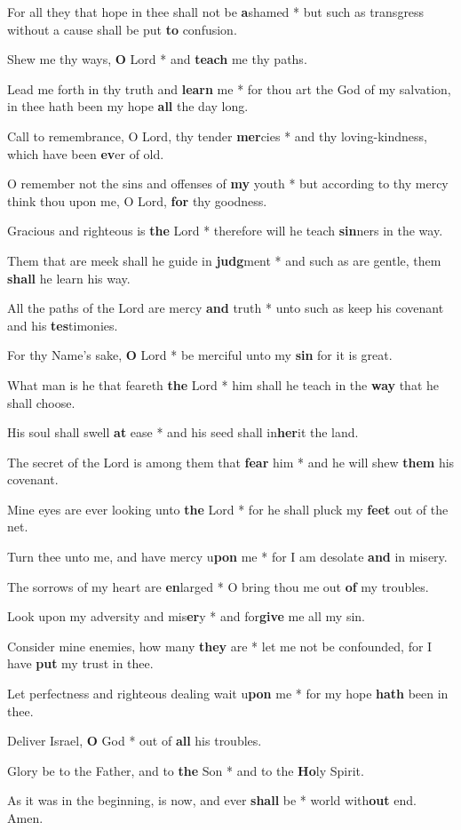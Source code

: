 \begin{multicols}{2}
	For all they that hope in thee shall not be \textbf{a}shamed * but such as transgress without a cause shall be put \textbf{to} confusion.
	
	Shew me thy ways, \textbf{O} Lord * and \textbf{teach} me thy paths.
	
	Lead me forth in thy truth and \textbf{learn} me * for thou art the God of my salvation, in thee hath been my hope \textbf{all} the day long.
	
	Call to remembrance, O Lord, thy tender \textbf{mer}cies * and thy loving-kindness, which have been \textbf{ev}er of old.
	
	O remember not the sins and offenses of \textbf{my} youth * but according to thy mercy think thou upon me, O Lord, \textbf{for} thy goodness.
	
	Gracious and righteous is \textbf{the} Lord * therefore will he teach \textbf{sin}ners in the way.
	
	Them that are meek shall he guide in \textbf{judg}ment * and such as are gentle, them \textbf{shall} he learn his way.
	
	All the paths of the Lord are mercy \textbf{and} truth * unto such as keep his covenant and his \textbf{tes}timonies.
	
	For thy Name's sake, \textbf{O} Lord * be merciful unto my \textbf{sin} for it is great.
	
	What man is he that feareth \textbf{the} Lord * him shall he teach in the \textbf{way} that he shall choose.
	
	His soul shall swell \textbf{at} ease * and his seed shall in\textbf{her}it the land.
	
	The secret of the Lord is among them that \textbf{fear} him * and he will shew \textbf{them} his covenant.
	
	Mine eyes are ever looking unto \textbf{the} Lord * for he shall pluck my \textbf{feet} out of the net.
	
	Turn thee unto me, and have mercy u\textbf{pon} me * for I am desolate \textbf{and} in misery.
	
	The sorrows of my heart are \textbf{en}larged * O bring thou me out \textbf{of} my troubles.
	
	Look upon my adversity and mis\textbf{er}y * and for\textbf{give} me all my sin.
	
	Consider mine enemies, how many \textbf{they} are * let me not be confounded, for I have \textbf{put} my trust in thee.
	
	Let perfectness and righteous dealing wait u\textbf{pon} me * for my hope \textbf{hath} been in thee.
	
	Deliver Israel, \textbf{O} God * out of \textbf{all} his troubles.
	
	Glory be to the Father, and to \textbf{the} Son * and to the \textbf{Ho}ly Spirit.
	
	As it was in the beginning, is now, and ever \textbf{shall} be * world with\textbf{out} end. Amen.
\end{multicols}